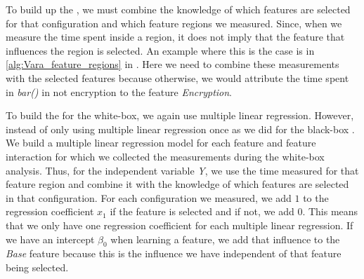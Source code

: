 To build up the {\perfInfluenceModel}, we must combine the knowledge of which features are selected for that configuration and which 
feature regions we measured. Since, when we measure the time spent inside a region, 
it does not imply that the feature that influences the region is selected. 
An example where this is the case is in \autoref{alg:Vara_feature_regions} in .
Here we need to combine these measurements with the selected features because otherwise,
we would attribute the time spent in \emph{bar()} in not encryption to the feature \emph{Encryption}.

To build the {\perfInfluenceModel} for the white-box, we again use multiple linear regression.
However, instead of only using multiple linear regression once as we did for the black-box {\perfInfluenceModel}.
We build a multiple linear regression model for each feature and feature interaction for which we collected the measurements during 
the white-box analysis.
Thus, for the independent variable \emph{Y},
we use the time measured for that feature region and combine it with the knowledge of which features are selected in that configuration.
For each configuration we measured, we add $1$ to the regression coefficient $x_1$ if the feature is selected and if not,
we add $0$. This means that we only have one regression coefficient for each multiple linear regression.
If we have an intercept $\beta_0$ when learning a feature,
we add that influence to the \emph{Base} feature because this is the influence we have independent of that feature being selected.


